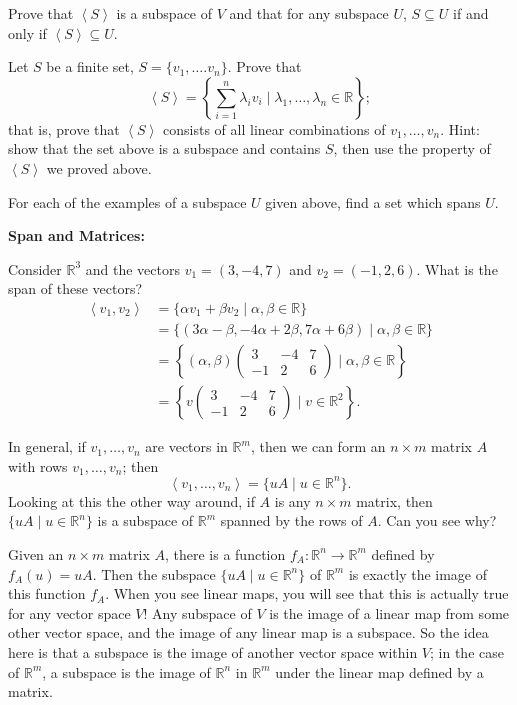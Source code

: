 \documentclass{article}
\newcommand{\SP}[1]{\left\langle #1 \right\rangle}
\begin{document}
Prove that $\SP{S}$ is a subspace of $V$ and that for any subspace $U$, $S\subseteq U$ if and only if $\SP{S}\subseteq U$.
\vfill

Let $S$ be a finite set, $S=\{v_1,\hdots.v_n\}$. Prove that
\[\SP{S}=\left\{\sum_{i=1}^n \lambda_iv_i \mid \lambda_1,\hdots,\lambda_n\in\mathbb{R}\right\};\]
that is, prove that $\SP{S}$ consists of all linear combinations of $v_1,\hdots,v_n$. Hint: show that the set above is a subspace and contains $S$, then use the property of $\SP{S}$ we proved above.

\vfill

For each of the examples of a subspace $U$ given above, find a set which spans $U$.

\clearpage

\textbf{Span and Matrices:}\bigskip

Consider $\mathbb{R}^3$ and the vectors $v_1=(3,-4,7)$ and $v_2=(-1,2,6)$. What is the span of these vectors?
\begin{align*}
	\SP{v_1,v_2}&=\{\alpha v_1+\beta v_2\mid \alpha,\beta\in\mathbb{R}\}\\
	&=\{(3\alpha-\beta,-4\alpha + 2\beta,7\alpha+6\beta)\mid \alpha,\beta\in\mathbb{R}\}\\
	&=\left\{(\alpha, \beta)\left(\begin{array}{ccc} 3 & -4 & 7\\ -1 & 2 & 6\end{array}\right)\mid \alpha,\beta\in\mathbb{R}\right\}\\
	&=\left\{v\left(\begin{array}{ccc} 3 & -4 & 7\\ -1 & 2 & 6\end{array}\right)\mid v\in\mathbb{R}^2\right\}.
\end{align*}

In general, if $v_1,\hdots,v_n$ are vectors in $\mathbb{R}^m$, then we can form an $n\times m$ matrix $A$ with rows $v_1,\hdots,v_n$; then
\[\SP{v_1,\hdots,v_n}=\{uA\mid u\in\mathbb{R}^n\}.\]
Looking at this the other way around, if $A$ is any $n\times m$ matrix, then $\{uA\mid u\in\mathbb{R}^n\}$ is a subspace of $\mathbb{R}^m$ spanned by the rows of $A$. Can you see why?
\vfill



Given an $n\times m$ matrix $A$, there is a function $f_A:\mathbb{R}^n\to\mathbb{R}^m$ defined by $f_A(u)=uA$. Then the subspace $\{uA\mid u\in\mathbb{R}^n\}$ of $\mathbb{R}^m$ is exactly the image of this function $f_A$. When you see linear maps, you will see that this is actually true for any vector space $V$! Any subspace of $V$ is the image of a linear map from some other vector space, and the image of any linear map is a subspace. So the idea here is that a subspace is the image of another vector space within $V$; in the case of $\mathbb{R}^m$, a subspace is the image of $\mathbb{R}^n$ in $\mathbb{R}^m$ under the linear map defined by a matrix.\medskip
\end{document}
